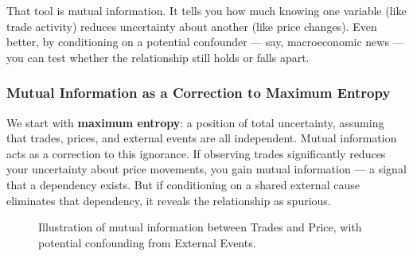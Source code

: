 That tool is mutual information. It tells you how much knowing one variable (like trade activity) reduces uncertainty about another (like price changes). Even better, by conditioning on a potential confounder — say, macroeconomic news — you can test whether the relationship still holds or falls apart.

\subsubsection{Mutual Information as a Correction to Maximum Entropy}

\vspace{0.5em}
\noindent
We start with \textbf{maximum entropy}: a position of total uncertainty, assuming that trades, prices, and external events are all independent. Mutual information acts as a correction to this ignorance. If observing trades significantly reduces your uncertainty about price movements, you gain mutual information — a signal that a dependency exists. But if conditioning on a shared external cause eliminates that dependency, it reveals the relationship as spurious.

\begin{figure}[H]
\centering
{}
\caption{Illustration of mutual information between Trades and Price, with potential confounding from External Events.}
\end{figure}

